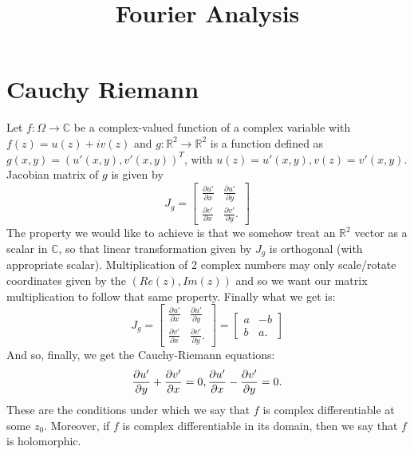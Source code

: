 \documentclass[a4paper, 11pt]{article}
\title{Fourier Analysis}
\newcommand{\Real}{\mathbb{R}}
\newcommand{\Complex}{\mathbb{C}}
\newcommand{\tangentvector}[2]{\frac{\partial #1}{\partial #2}}
\theoremstyle{definition}
\begin{document}
\maketitle
\hypersetup{linkcolor=black}
\tableofcontents

\section{Cauchy Riemann}
Let $f: \Omega \to \Complex$ be a complex-valued function of a complex variable with $f(z) = u(z) + i v(z)$ and $g: \Real^2 \to \Real^2$ is a function defined as $g(x, y) = (u'(x, y), v'(x, y))^T$, with $u(z) = u'(x, y), v(z) = v'(x, y)$.
Jacobian matrix of $g$ is given by
\begin{equation}
	J_g = \begin{bmatrix}
		\tangentvector{u'}{x} & \tangentvector{u'}{y} \\
		\tangentvector{v'}{x} & \tangentvector{v'}{y}.
	\end{bmatrix}
\end{equation}
The property we would like to achieve is that we somehow treat an $\Real^2$ vector as a scalar in $\Complex$, so that linear transformation given by $J_g$ is orthogonal (with appropriate scalar). Multiplication of 2 complex numbers may only scale/rotate coordinates given by the $(Re(z), Im(z))$ and so we want our matrix multiplication to follow that same property. Finally what we get is:
\begin{equation}
	J_g = \begin{bmatrix}
		\tangentvector{u'}{x} & \tangentvector{u'}{y} \\
		\tangentvector{v'}{x} & \tangentvector{v'}{y}.
	\end{bmatrix}
	= \begin{bmatrix}
		a & -b \\
		b & a.
	\end{bmatrix}
\end{equation}
And so, finally, we get the Cauchy-Riemann equations:
\begin{equation}
	\tangentvector{u'}{y} + \tangentvector{v'}{x} = 0, \\
	\tangentvector{u'}{x} - \tangentvector{v'}{y} = 0.
\end{equation}
These are the conditions under which we say that $f$ is complex differentiable at some $z_0$. Moreover, if $f$ is complex differentiable in its domain, then we say that $f$ is holomorphic.
\end{document}
